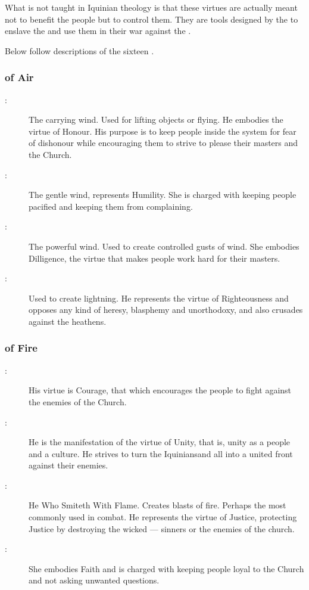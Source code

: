 What is not taught in Iquinian theology is that these virtues are actually meant not to benefit the people but to control them. They are tools designed by the \banes{} to enslave the \humans{} and use them in their war against the \dragons. 

Below follow descriptions of the sixteen \Sephiroth{}.



\newenvironment{sephlist}{\begin{description}}{\end{description}}
\newcommand{\seph}[1]{\item[#1:]}



\subsubsection{\Sephiroth{} of Air}
\begin{sephlist}
\seph{\Atzirah{}}
The carrying wind. Used for lifting objects or flying. He embodies the virtue of Honour. His purpose is to keep people inside the system for fear of dishonour while encouraging them to strive to please their masters and the Church. 

\seph{\Feazirah{}}
The gentle wind, represents Humility. She is charged with keeping people pacified and keeping them from complaining. 

\seph{\Keshirah{}}
The powerful wind. Used to create controlled gusts of wind. She embodies Dilligence, the virtue that makes people work hard for their masters. 

\seph{\Razilah{}}
Used to create lightning. He represents the virtue of Righteousness and opposes any kind of heresy, blasphemy and unorthodoxy, and also crusades against the heathens. 

\end{sephlist}

\subsubsection{\Sephiroth{} of Fire}
\begin{sephlist}
\seph{\Barion{}}
His virtue is Courage, that which encourages the people to fight against the enemies of the Church.

\seph{\Hapheron{}}
He is the manifestation of the virtue of Unity, that is, unity as a people and a culture. He strives to turn the Iquinians\dash and all \humans\dash into a united front against their enemies. 

\seph{\Izion{}}
He Who Smiteth With Flame. Creates blasts of fire. Perhaps the \Sephirah{} most commonly used in combat. He represents the virtue of Justice, protecting Justice by destroying the wicked --- sinners or the enemies of the church. 

\seph{\Teshiron{}}
She embodies Faith and is charged with keeping people loyal to the Church and not asking unwanted questions. 

\end{sephlist}

